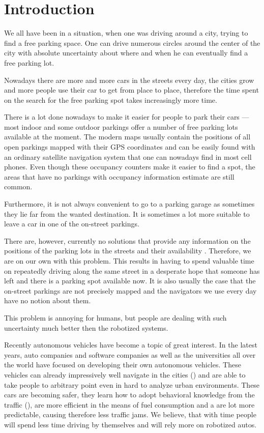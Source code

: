 \chapter{Introduction} %
\label{cha:introduction}
    We all have been in a situation, when one was driving around a city, trying to find a free parking space. One can drive numerous circles around the center of the city with absolute uncertainty about where and when he can eventually find a free parking lot.

    Nowadays there are more and more cars in the streets every day, the cities grow and more people use their car to get from place to place, therefore the time spent on the search for the free parking spot takes increasingly more time. 

    There is a lot done nowadays to make it easier for people to park their cars --- most indoor and some outdoor parkings offer a number of free parking lots available at the moment. The modern maps usually contain the positions of all open parkings mapped with their GPS coordinates and can be easily found with an ordinary satellite navigation system  that one can nowadays find in most cell phones. Even though these occupancy counters make it easier to find a spot, the areas that have no parkings with occupancy information estimate are still common.

    Furthermore, it is not always convenient to go to a parking garage as sometimes they lie far from the wanted destination. It is sometimes a lot more suitable to leave a car in one of the on-street parkings.

    There are, however, currently no solutions that provide any information on the positions of the parking lots in the streets and their availability . Therefore, we are on our own with this problem. This results in having to spend valuable time on repeatedly driving along the same street in a desperate hope that someone has left and there is a parking spot available now. It is also usually the case that the on-street parkings are not precisely mapped and the navigators we use every day have no notion about them.

    This problem is annoying for humans, but people are dealing with such uncertainty much better then the robotized systems.

    Recently autonomous vehicles have become a topic of great interest.
    In the latest years, auto companies and software companies as well as the universities all over the world have focused on developing their own autonomous vehicles. These vehicles can already impressively well navigate in the cities (\cite{stanley_auto_car,perceprion_drivec_car,lima13}) and are able to take people to arbitrary point even in hard to analyze urban environments. These cars are becoming safer, they learn how to adopt behavioral knowledge from the traffic (\cite{behaviour_learning,spinello10:multiclass}), are more efficient in the means of fuel consumption and a are lot more predictable, causing therefore less traffic jams. We believe, that with time people will spend less time driving by themselves and will rely more on robotized autos.

